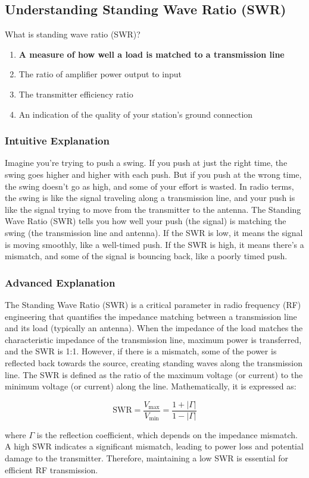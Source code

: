 \subsection{Understanding Standing Wave Ratio (SWR)}
\label{T9B12}

\begin{tcolorbox}[colback=gray!10!white,colframe=black!75!black,title=T9B12]
What is standing wave ratio (SWR)?
\begin{enumerate}[noitemsep]
    \item \textbf{A measure of how well a load is matched to a transmission line}
    \item The ratio of amplifier power output to input
    \item The transmitter efficiency ratio
    \item An indication of the quality of your station’s ground connection
\end{enumerate}
\end{tcolorbox}

\subsubsection*{Intuitive Explanation}
Imagine you're trying to push a swing. If you push at just the right time, the swing goes higher and higher with each push. But if you push at the wrong time, the swing doesn't go as high, and some of your effort is wasted. In radio terms, the swing is like the signal traveling along a transmission line, and your push is like the signal trying to move from the transmitter to the antenna. The Standing Wave Ratio (SWR) tells you how well your push (the signal) is matching the swing (the transmission line and antenna). If the SWR is low, it means the signal is moving smoothly, like a well-timed push. If the SWR is high, it means there's a mismatch, and some of the signal is bouncing back, like a poorly timed push.

\subsubsection*{Advanced Explanation}
The Standing Wave Ratio (SWR) is a critical parameter in radio frequency (RF) engineering that quantifies the impedance matching between a transmission line and its load (typically an antenna). When the impedance of the load matches the characteristic impedance of the transmission line, maximum power is transferred, and the SWR is 1:1. However, if there is a mismatch, some of the power is reflected back towards the source, creating standing waves along the transmission line. The SWR is defined as the ratio of the maximum voltage (or current) to the minimum voltage (or current) along the line. Mathematically, it is expressed as:

\[
\text{SWR} = \frac{V_{\text{max}}}{V_{\text{min}}} = \frac{1 + |\Gamma|}{1 - |\Gamma|}
\]

where \(\Gamma\) is the reflection coefficient, which depends on the impedance mismatch. A high SWR indicates a significant mismatch, leading to power loss and potential damage to the transmitter. Therefore, maintaining a low SWR is essential for efficient RF transmission.